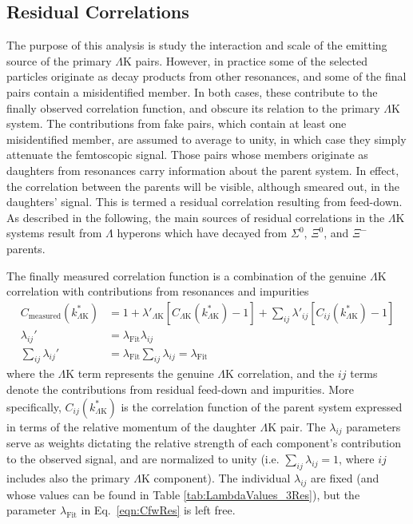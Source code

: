 \documentclass[ALICE,manyauthors]{cernphprep}
\newcommand{\Lam}{$\Lambda$\xspace}
\newcommand{\LamK}{$\Lambda$K\xspace}
\begin{document}
\subsection{Residual Correlations}
\label{ResidualCorrelations}

The purpose of this analysis is study the interaction and scale of the emitting source of the primary \LamK pairs.
However, in practice some of the selected particles originate as decay products from other resonances, and some of the final pairs contain a misidentified member.
In both cases, these contribute to the finally observed correlation function, and obscure its relation to the primary \LamK system.
The contributions from fake pairs, which contain at least one misidentified member, are assumed to average to unity, in which case they simply attenuate the femtoscopic signal.
Those pairs whose members originate as daughters from resonances carry information about the parent system.
In effect, the correlation between the parents will be visible, although smeared out, in the daughters' signal.
This is termed a residual correlation resulting from feed-down.  
As described in the following, the main sources of residual correlations in the \LamK systems result from \Lam hyperons which have decayed from $\Sigma^{0}$, $\Xi^{0}$, and $\Xi^{-}$ parents.

The finally measured correlation function is a combination of the genuine \LamK correlation with contributions from resonances and impurities \cite{Kisiel:2014mma}
\begin{equation}
\begin{aligned}
\label{eqn:CfwRes} 
 C_{\mathrm{measured}}(k^{*}_{\Lambda\mathrm{K}}) &= 1 + \lambda'_{\Lambda\mathrm{K}}[C_{\Lambda\mathrm{K}}(k^{*}_{\Lambda\mathrm{K}}) - 1] + \sum\limits_{ij}  \lambda'_{ij}[C_{ij}(k^{*}_{\Lambda\mathrm{K}})-1] \\
 \lambda_{ij}' &= \lambda_{\mathrm{Fit}}\lambda_{ij} \\
 \sum\limits_{ij}\lambda_{ij}' &=  \lambda_{\mathrm{Fit}}\sum\limits_{ij}\lambda_{ij} = \lambda_{\mathrm{Fit}}
\end{aligned} 
\end{equation}
where the \LamK term represents the genuine \LamK correlation, and the $ij$ terms denote the contributions from residual feed-down and impurities.
More specifically, $C_{ij}(k^{*}_{\Lambda\mathrm{K}})$ is the correlation function of the parent system expressed in terms of the relative momentum of the daughter \LamK pair.  
The $\lambda_{ij}$ parameters serve as weights dictating the relative strength of each component's contribution to the observed signal, and are normalized to unity (i.e. $\sum_{ij} \lambda_{ij} = 1$, where $ij$ includes also the primary \LamK component).
The individual $\lambda_{ij}$ are fixed (and whose values can be found in Table \ref{tab:LambdaValues_3Res}), but the parameter $\lambda_{\mathrm{Fit}}$ in Eq.\ \ref{eqn:CfwRes} is left free.
\end{document}
